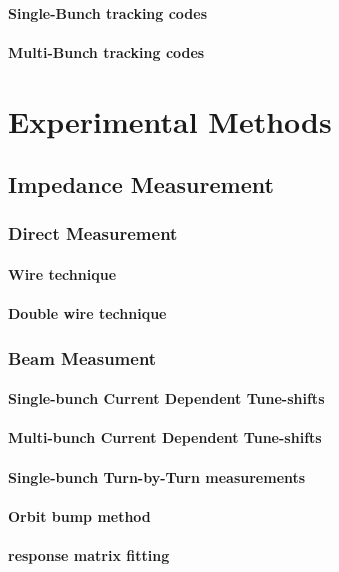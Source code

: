 \documentclass[
	12pt,				%
	openright,			%
	oneside,			%
	a4paper,		%
	chapter=TITLE,		%
	section=TITLE,		%
    brazil,				%
	english,			%
	sumario=tradicional,
	]{abntex2}
\begin{document}
      \subsubsection{Single-Bunch tracking codes}
      \subsubsection{Multi-Bunch tracking codes}


\chapter{Experimental Methods}
  \section{Impedance Measurement}
    \subsection{Direct Measurement}
      \subsubsection{Wire technique}
      \subsubsection{Double wire technique}
    \subsection{Beam Measument}
      \subsubsection{Single-bunch Current Dependent Tune-shifts}
      \subsubsection{Multi-bunch Current Dependent Tune-shifts}
      \subsubsection{Single-bunch Turn-by-Turn measurements}
      \subsubsection{Orbit bump method}
      \subsubsection{response matrix fitting}
\end{document}
